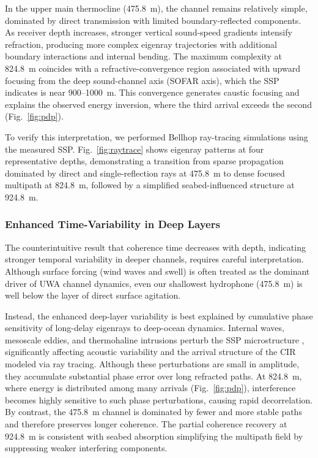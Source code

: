 \documentclass[lettersize,journal]{IEEEtran}
\begin{document}
In the upper main thermocline  (475.8~m), the channel remains relatively simple, dominated by direct transmission with limited boundary-reflected components. As receiver depth increases, stronger vertical sound-speed gradients intensify refraction, producing more complex eigenray trajectories with additional boundary interactions and internal bending. The maximum complexity at 824.8~m coincides with a refractive-convergence region associated with upward focusing from the deep sound-channel axis (SOFAR axis), which the SSP indicates is near 900--1000~m. This convergence generates caustic focusing and explains the observed energy inversion, where the third arrival exceeds the second (Fig.~\ref{fig:pdp}).


To verify this interpretation, we performed Bellhop ray-tracing simulations using the measured SSP. Fig.~\ref{fig:raytrace} shows eigenray patterns at four representative depths, demonstrating a transition from sparse propagation dominated by direct and single-reflection rays at 475.8~m to dense focused multipath at 824.8~m, followed by a simplified seabed-influenced structure at 924.8~m.



\subsubsection{Enhanced Time-Variability in Deep Layers}

The counterintuitive result that coherence time decreases with depth, indicating stronger temporal variability in deeper channels, requires careful interpretation. Although surface forcing (wind waves and swell) is often treated as the dominant driver of UWA channel dynamics, even our shallowest hydrophone (475.8~m) is well below the layer of direct surface agitation.

Instead, the enhanced deep-layer variability is best explained by cumulative phase sensitivity of long-delay eigenrays to deep-ocean dynamics. Internal waves, mesoscale eddies, and thermohaline intrusions perturb the SSP microstructure \cite{ref21}, significantly affecting acoustic variability and the arrival structure of the CIR modeled via ray tracing\cite{ref22}. Although these perturbations are small in amplitude, they accumulate substantial phase error over long refracted paths. At 824.8~m, where energy is distributed among many arrivals (Fig.~\ref{fig:pdp}), interference becomes highly sensitive to such phase perturbations, causing rapid decorrelation. By contrast, the 475.8~m channel is dominated by fewer and more stable paths and therefore preserves longer coherence. The partial coherence recovery at 924.8~m is consistent with seabed absorption simplifying the multipath field by suppressing weaker interfering components.
\end{document}
